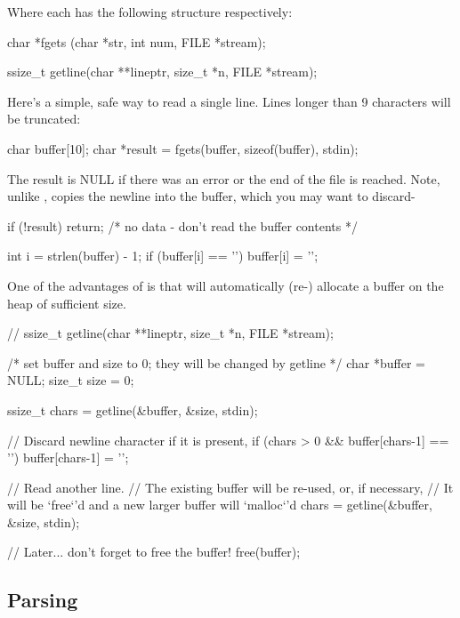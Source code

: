 Where each has the following structure respectively:

\begin{code}[language=C]
char *fgets (char *str, int num, FILE *stream); 

ssize_t getline(char **lineptr, size_t *n, FILE *stream);
\end{code}

Here's a simple, safe way to read a single line. Lines longer than 9 characters will be truncated:

\begin{code}[language=C]
char buffer[10];
char *result = fgets(buffer, sizeof(buffer), stdin);
\end{code}

The result is NULL if there was an error or the end of the file is reached. Note, unlike ,  copies the newline into the buffer, which you may want to discard-

\begin{code}[language=C]
if (!result) { return; /* no data - don't read the buffer contents */}

int i = strlen(buffer) - 1;
if (buffer[i] == '\n') 
    buffer[i] = '\0';
\end{code}

One of the advantages of  is that will automatically (re-) allocate a buffer on the heap of sufficient size.

\begin{code}[language=C]
// ssize_t getline(char **lineptr, size_t *n, FILE *stream);

 /* set buffer and size to 0; they will be changed by getline */
char *buffer = NULL;
size_t size = 0;

ssize_t chars = getline(&buffer, &size, stdin);

// Discard newline character if it is present,
if (chars > 0 && buffer[chars-1] == '\n') 
    buffer[chars-1] = '\0';

// Read another line.
// The existing buffer will be re-used, or, if necessary,
// It will be `free`'d and a new larger buffer will `malloc`'d
chars = getline(&buffer, &size, stdin);

// Later... don't forget to free the buffer!
free(buffer);
\end{code}

\subsection{Parsing}

